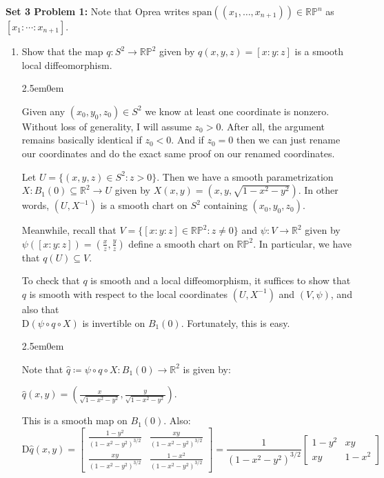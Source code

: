 \documentclass{book}
\newcommand{\Hstatement}{%
   \color{MidnightBlue!90!Black}%
   \fontsize{12}{13}\selectfont%
}
\newcommand{\HexOne}{%
   \color{Purple}%
   \fontsize{12}{13}\selectfont%
}
\newcommand{\HexTwoP}{%
   \color{RedViolet}%
   \fontsize{12}{13}\selectfont%
}
\newenvironment{myIndent}{%
   \begin{adjustwidth}{2.5em}{0em}%
}{%
   \end{adjustwidth}%
}
\newcommand{\blab}[1]{\textbf{#1}}
\newcommand{\Df}{\mathrm{D}}
\newcommand{\mSpan}{\mathrm{span}}
\newcommand{\retTwo}{\hfill\bigbreak}
\begin{document}
\Hstatement\blab{Set 3 Problem 1:} Note that Oprea writes $\mSpan((x_1, \ldots, x_{n+1})) \in \mathbb{RP}^n$ as $[x_1 : \cdots : x_{n+1}]$.
\begin{enumerate}
	\item[(i)] Show that the map $q: S^2 \to \mathbb{RP}^2$ given by $q(x, y, z) = [x : y : z]$ is a smooth local diffeomorphism.
	\begin{myIndent}\HexOne
		Given any $(x_0, y_0, z_0) \in S^2$ we know at least one coordinate is nonzero. Without loss of generality, I will assume $z_0 > 0$. After all, the argument remains basically identical if $z_0 < 0$. And if $z_0 = 0$ then we can just rename our coordinates and do the exact same proof on our renamed coordinates.\retTwo

		Let $U = \{(x, y, z) \in S^2 : z > 0\}$. Then we have a smooth parametrization\\ $X: B_1(0) \subseteq \mathbb{R}^2 \to U$ given by $X(x, y) = (x, y, \sqrt{1 - x^2 - y^2})$. In other\\ words, $(U, X^{-1})$ is a smooth chart on $S^2$ containing $(x_0, y_0, z_0)$.\retTwo

		Meanwhile, recall that $V = \{[x:y:z] \in \mathbb{RP}^2 : z \neq 0\}$ and $\psi: V \to \mathbb{R}^2$ given by $\psi([x:y:z]) = (\frac{x}{z}, \frac{y}{z})$ define a smooth chart on $\mathbb{RP}^2$. In particular, we have that $q(U) \subseteq V$.\retTwo

		To check that $q$ is smooth and a local diffeomorphism, it suffices to show that $q$ is smooth with respect to the local coordinates $(U, X^{-1})$ and $(V, \psi)$, and also that\\ $\Df(\psi \circ q \circ X)$ is invertible on $B_1(0)$. Fortunately, this is easy.
		\begin{myIndent}\HexTwoP
			Note that $\widehat{q} \coloneqq \psi \circ q \circ X: B_1(0) \to \mathbb{R}^2$ is given by:
			
			{\centering$\widehat{q}(x, y) = (\frac{x}{\sqrt{1 - x^2 - y^2}}, \frac{y}{\sqrt{1 - x^2 - y^2}})$.\retTwo\par}

			This is a smooth map on $B_1(0)$. Also:
			$$\Df \widehat{q}(x, y) = \begin{bmatrix} \frac{1 - y^2}{(1 - x^2 - y^2)^{3/2}} & \frac{xy}{(1 - x^2 - y^2)^{3/2}} \\ \frac{xy}{(1 - x^2 - y^2)^{3/2}} & \frac{1 - x^2}{(1 - x^2 - y^2)^{3/2}}\end{bmatrix} = \frac{1}{(1 - x^2 - y^2)^{3/2}}\begin{bmatrix} 1 - y^2 & xy \\ xy & 1 - x^2\end{bmatrix}$$\newpage


\end{myIndent}
\end{myIndent}
\end{enumerate}
\end{document}
